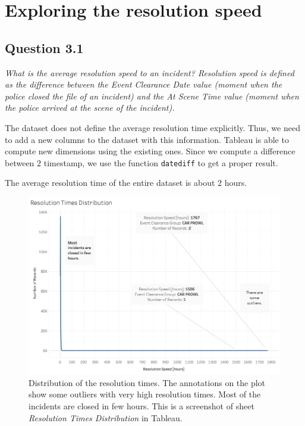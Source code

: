 \section{Exploring the resolution speed}
\label{sec:question3}

\subsection*{Question 3.1}
\textit{What is the average resolution speed to an incident? Resolution speed is defined as the difference between the Event Clearance Date value (moment when the police closed the file of an incident) and the At Scene Time value (moment when the police arrived at the scene of the incident).}

The dataset does not define the average resolution time explicitly.
Thus, we need to add a new columns to the dataset with this information.
Tableau is able to compute new dimensions using the existing ones.
Since we compute a difference between $2$ timestamp, we use the function \texttt{datediff} to get a proper result.

The average resolution time of the entire dataset is about $2$ hours.

\begin{figure}[h]
	\centering
	\includegraphics[width=0.9\columnwidth]{figures/3_1_resolution_speed_outliers}
	\caption{Distribution of the resolution times. The annotations on the plot show some outliers with very high resolution times. Most of the incidents are closed in few hours. This is a screenshot of sheet \textit{Resolution Times Distribution} in Tableau.}
	\label{fig:3_1_resolution_speed_outliers}
\end{figure}

